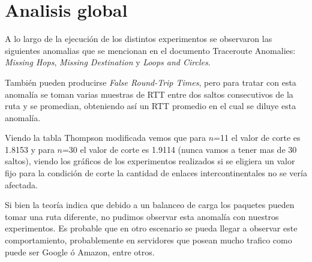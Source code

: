 \section{Analisis global}
A lo largo de la ejecución de los distintos experimentos se observaron las siguientes anomalias que se mencionan en el documento Traceroute Anomalies:
\emph{Missing Hops}, \emph{Missing Destination} y \emph{Loops and Circles}.

También pueden producirse \emph{False Round-Trip Times}, pero para tratar con esta anomalía se toman varias muestras de RTT entre dos saltos consecutivos de la ruta y se promedian, obteniendo así un RTT promedio en el cual se diluye esta anomalía.

Viendo la tabla Thompson modificada vemos que para $n$=11 el valor de corte es 1.8153 y para $n$=30 el valor de corte es 1.9114 (nunca vamos a tener mas de 30 saltos), viendo los gráficos de los experimentos realizados si se eligiera un valor fijo para la condición de corte la cantidad de enlaces intercontinentales no se vería afectada.

Si bien la teoría indica que debido a un balanceo de carga los paquetes pueden tomar una ruta diferente, no pudimos observar esta anomalía
con nuestros experimentos. Es probable que en otro escenario se pueda llegar a observar	este comportamiento, probablemente en servidores
que posean mucho trafico como puede ser Google ó Amazon, entre otros.
